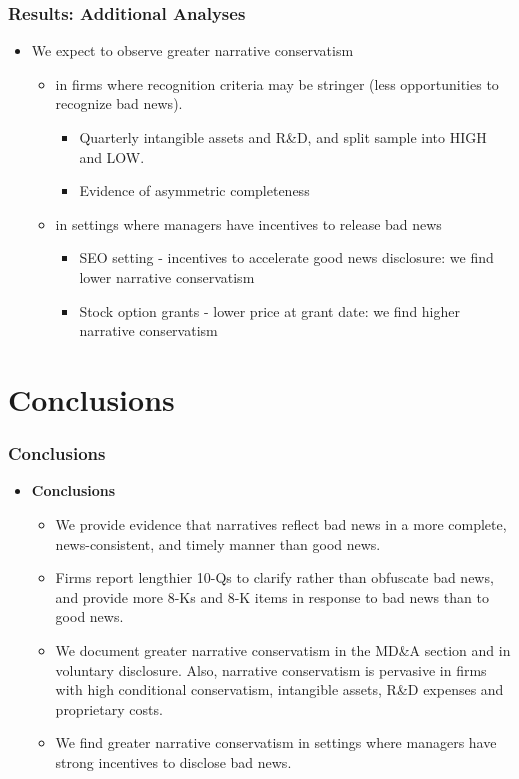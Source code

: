 \documentclass{beamer}
\begin{document}
\begin{frame}
\frametitle{Results: Additional Analyses}
\begin{itemize}
	\item We expect to observe greater narrative conservatism
	\begin{itemize}
		\item in firms where recognition criteria may be stringer (less opportunities to recognize bad news).
		\begin{itemize}
			\item Quarterly intangible assets and R\&D, and split sample into HIGH and LOW.
			\item Evidence of asymmetric completeness 
		\end{itemize}
		\pause
		\item in settings where managers have incentives to release bad news
				\begin{itemize}
			\item SEO setting - incentives to accelerate good news disclosure: we find lower narrative conservatism
			\item Stock option grants - lower price at grant date: we find higher narrative conservatism
		\end{itemize}
	\end{itemize}
\end{itemize}
\end{frame}



\section{Conclusions}
\begin{frame}
\frametitle{Conclusions}
\begin{itemize}
	\item \textbf{Conclusions}
	\begin{itemize}
		\item We provide evidence that narratives reflect bad news in a more complete, news-consistent, and timely manner than good news. 
		\item Firms report lengthier 10-Qs to clarify rather than obfuscate bad news, and provide more 8-Ks and 8-K items in response to bad news than to good news.
		\item We document greater narrative conservatism in the MD\&A section and in voluntary disclosure. Also, narrative conservatism is pervasive in firms with high conditional conservatism, intangible assets, R\&D expenses and proprietary costs.
		\item We find greater narrative conservatism in settings where managers have strong incentives to disclose bad news.
	\end{itemize}


	
\end{itemize}

\end{frame}
\end{document}
